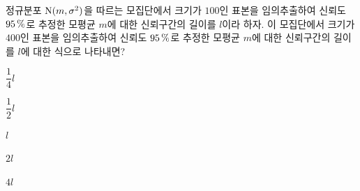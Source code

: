 정규분포 $\mathrm{N}(m{,}\mkern3mu\mathopen{}\sigma^2)$을 따르는 모집단에서 크기가 $100$인 표본을 임의추출하여 신뢰도 $95\mkern3mu \%$로 추정한 모평균 $m$에 대한 신뢰구간의 길이를 $l$이라 하자. 이 모집단에서 크기가 $400$인 표본을 임의추출하여 신뢰도 $95\mkern3mu \%$로 추정한 모평균 $m$에 대한 신뢰구간의 길이를 $l$에 대한 식으로 나타내면? 
\begin{choices32}{\rule[-3ex]{0pt}{8ex}$\dfrac{1}{4}l$}{\rule[-3ex]{0pt}{8ex}$\dfrac{1}{2}l$}{\rule[-3ex]{0pt}{8ex}$l$}{\rule[-3ex]{0pt}{8ex}$2l$}{\rule[-3ex]{0pt}{8ex}$4l$}\end{choices32}
